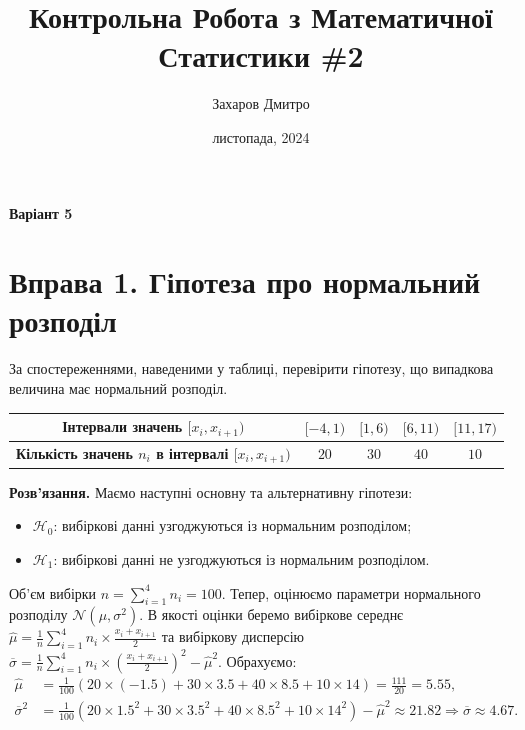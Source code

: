 \documentclass{../hw_template}
\title{\huge\sffamily\bfseries Контрольна Робота з Математичної Статистики \#2}
\author{\Large\sffamily Захаров Дмитро}
\date{\sffamily 23 листопада, 2024}
\begin{document}
\pagestyle{fancy}

\maketitle

\begin{center}
    \textbf{Варіант 5}
\end{center}

\tableofcontents

\pagebreak

\section{Вправа 1. Гіпотеза про нормальний розподіл}

\begin{problem}
    За спостереженнями, наведеними у таблиці, перевірити гіпотезу, що
    випадкова величина має нормальний розподіл.

    \begin{center}
        \begin{tabular}{|c|c|c|c|c|}
            \hline
            \textbf{Інтервали значень $[x_i,x_{i+1})$} & $[-4,1)$ & $[1,6)$ & $[6,11)$ & $[11,17)$ \\
            \hline
            \textbf{Кількість значень $n_i$ в інтервалі $[x_i,x_{i+1})$} & $20$ & $30$ & $40$ & $10$ \\
            \hline
        \end{tabular}
    \end{center}
\end{problem}

\textbf{Розв'язання.} Маємо наступні основну та альтернативну гіпотези:
\begin{itemize}
    \item $\mathcal{H}_0$: вибіркові данні узгоджуються із нормальним розподілом;
    \item $\mathcal{H}_1$: вибіркові данні не узгоджуються із нормальним розподілом.
\end{itemize}

Об'єм вибірки $n=\sum_{i=1}^4n_i = 100$. Тепер, оцінюємо параметри нормального
розподілу $\mathcal{N}(\mu,\sigma^2)$. В якості оцінки беремо вибіркове середнє
$\hat{\mu}=\frac{1}{n}\sum_{i=1}^4 n_i \times \frac{x_i+x_{i+1}}{2}$ та 
вибіркову дисперсію $\overline{\sigma} = \frac{1}{n}\sum_{i=1}^4 n_i \times \left(\frac{x_i+x_{i+1}}{2}\right)^2 - \hat{\mu}^2$. Обрахуємо:
\begin{align*}
    \hat{\mu} &= \frac{1}{100}\left(20 \times (-1.5) + 30 \times 3.5 + 40 \times 8.5 + 10 \times 14\right) = \frac{111}{20} = 5.55,\\
    \overline{\sigma}^2 &= \frac{1}{100}\left(20 \times 1.5^2 + 30 \times 3.5^2 + 40 \times 8.5^2 + 10 \times 14^2\right) - \hat{\mu}^2 \approx 21.82 \Rightarrow \overline{\sigma} \approx 4.67.
\end{align*}
\end{document}
